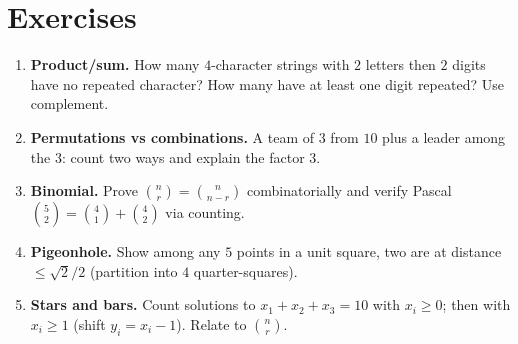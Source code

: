 \section{Exercises}
\label{sec:ch05-exercises}
\begin{enumerate}[label=E5.\arabic*, leftmargin=*, itemsep=0.6em]
\item \textbf{Product/sum.} How many $4$-character strings with $2$ letters then $2$ digits have no repeated character? How many have at least one digit repeated? Use complement.
\item \textbf{Permutations vs combinations.} A team of $3$ from $10$ plus a leader among the $3$: count two ways and explain the factor $3$.
\item \textbf{Binomial.} Prove $\binom{n}{r}=\binom{n}{n-r}$ combinatorially and verify Pascal $\binom{5}{2}= \binom{4}{1}+\binom{4}{2}$ via counting.
\item \textbf{Pigeonhole.} Show among any $5$ points in a unit square, two are at distance $\le\sqrt2/2$ (partition into $4$ quarter-squares).
\item \textbf{Stars and bars.} Count solutions to $x_1+x_2+x_3=10$ with $x_i\ge0$; then with $x_i\ge1$ (shift $y_i=x_i-1$). Relate to $\binom{n}{r}$.
\end{enumerate}
